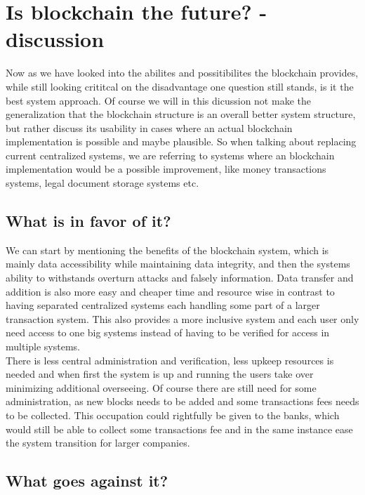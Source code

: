 \documentclass[paper=a4, fontsize=11pt]{scrartcl} %
\numberwithin{equation}{section} %
\numberwithin{figure}{section} %
\numberwithin{table}{section} %
\begin{document}
\section{Is blockchain the future? - discussion}

Now as we have looked into the abilites and possitibilites the blockchain provides, while still looking crititcal on the disadvantage one question still stands, is it the best system approach. Of course we will in this dicussion not make the generalization that the blockchain structure is an overall better system structure, but rather discuss its usability in cases where an actual blockchain implementation is possible and maybe plausible. So when talking about replacing current centralized systems, we are referring to systems where an blockchain implementation would be a possible improvement, like money transactions systems, legal document storage systems etc.
\newpage
\subsection{What is in favor of it?}

We can start by mentioning the benefits of the blockchain system, which is mainly data accessibility while maintaining data integrity, and then the systems ability to withstands overturn attacks and falsely information. Data transfer and addition is also more easy and cheaper time and resource wise in contrast to having separated centralized systems each handling some part of a larger transaction system. This also provides a more inclusive system and each user only need access to one big systems instead of having to be verified for access in multiple systems.\\

There is less central administration and verification, less upkeep resources is needed and when first the system is up and running the users take over minimizing additional overseeing. Of course there are still need for some administration, as new blocks needs to be added and some transactions fees needs to be collected. This occupation could rightfully be given to the banks, which would still be able to collect some transactions fee and in the same instance ease the system transition for larger companies.  

\subsection{What goes against it?}
\end{document}

